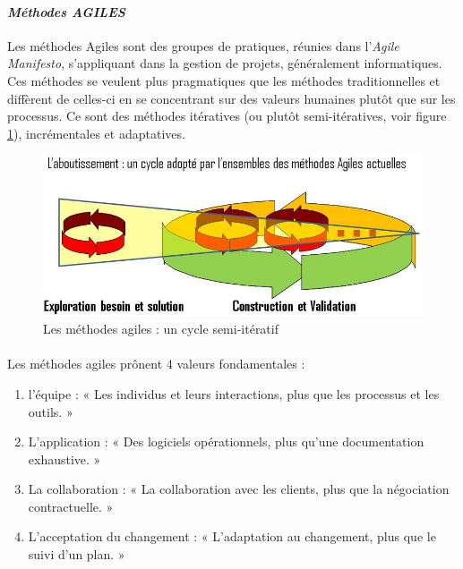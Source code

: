 	\paragraph{\emph{Méthodes AGILES}\\}
Les méthodes Agiles sont des groupes de pratiques, réunies dans l'\emph{Agile Manifesto}\cite{Agil01}, s'appliquant dans la gestion de projets, généralement informatiques. Ces méthodes se veulent plus pragmatiques que les méthodes traditionnelles et diffèrent de celles-ci en se concentrant sur des valeurs humaines plutôt que sur les processus. Ce sont des méthodes itératives (ou plutôt semi-itératives, voir figure \ref{agile}), incrémentales et adaptatives.
\begin{figure}
	\centering
	\includegraphics[scale=0.5]{images/agile.jpg}
	\caption{Les méthodes agiles : un cycle semi-itératif}
	\label{agile}
\end{figure}
 
\paragraph{}
Les méthodes agiles prônent 4 valeurs fondamentales :
	\begin{enumerate}
		\item l'équipe : « Les individus et leurs interactions, plus que les processus et les outils. »
		\item L'application : « Des logiciels opérationnels, plus qu'une documentation exhaustive. »
		\item  La collaboration : « La collaboration avec les clients, plus que la négociation contractuelle. »
		\item L'acceptation du changement : « L'adaptation au changement, plus que le suivi d'un plan. »
	\end{enumerate}

